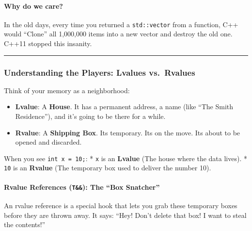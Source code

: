 \hypertarget{why-do-we-care}{%
\paragraph{Why do we care?}\label{why-do-we-care}}

In the old days, every time you returned a
\passthrough{\lstinline!std::vector!} from a function, C++ would
``Clone'' all 1,000,000 items into a new vector and destroy the old one.
C++11 stopped this insanity.

\begin{center}\rule{0.5\linewidth}{0.5pt}\end{center}

\hypertarget{understanding-the-players-lvalues-vs.-rvalues}{%
\subsubsection{Understanding the Players: Lvalues
vs.~Rvalues}\label{understanding-the-players-lvalues-vs.-rvalues}}

Think of your memory as a neighborhood:

\begin{itemize}
\tightlist
\item
  \textbf{Lvalue}: A \textbf{House}. It has a permanent address, a name
  (like ``The Smith Residence''), and it's going to be there for a
  while.
\item
  \textbf{Rvalue}: A \textbf{Shipping Box}. Its temporary. Its on the
  move. Its about to be opened and discarded.
\end{itemize}

When you see \passthrough{\lstinline!int x = 10;!}: *
\passthrough{\lstinline!x!} is an \textbf{Lvalue} (The house where the
data lives). * \passthrough{\lstinline!10!} is an \textbf{Rvalue} (The
temporary box used to deliver the number 10).

\hypertarget{rvalue-references-t-the-box-snatcher}{%
\paragraph{\texorpdfstring{Rvalue References (\texttt{T\&\&}): The ``Box
Snatcher''}{Rvalue References (T\&\&): The ``Box Snatcher''}}\label{rvalue-references-t-the-box-snatcher}}

An rvalue reference is a special hook that lets you grab these temporary
boxes before they are thrown away. It says: ``Hey! Don't delete that
box! I want to steal the contents!''

